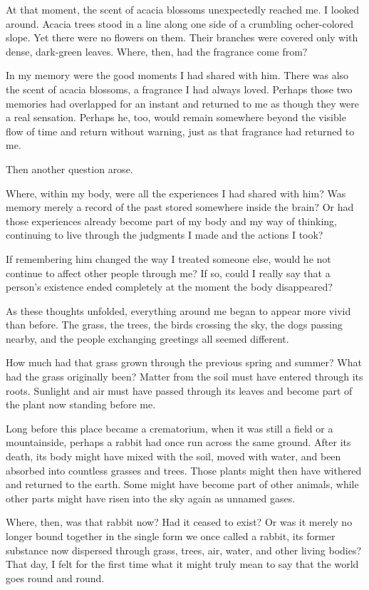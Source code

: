 At that moment, the scent of acacia blossoms unexpectedly reached me. I looked around. Acacia trees stood in a line along one side of a crumbling ocher-colored slope. Yet there were no flowers on them. Their branches were covered only with dense, dark-green leaves. Where, then, had the fragrance come from?

In my memory were the good moments I had shared with him. There was also the scent of acacia blossoms, a fragrance I had always loved. Perhaps those two memories had overlapped for an instant and returned to me as though they were a real sensation. Perhaps he, too, would remain somewhere beyond the visible flow of time and return without warning, just as that fragrance had returned to me.

Then another question arose.

Where, within my body, were all the experiences I had shared with him? Was memory merely a record of the past stored somewhere inside the brain? Or had those experiences already become part of my body and my way of thinking, continuing to live through the judgments I made and the actions I took?

If remembering him changed the way I treated someone else, would he not continue to affect other people through me? If so, could I really say that a person’s existence ended completely at the moment the body disappeared?

As these thoughts unfolded, everything around me began to appear more vivid than before. The grass, the trees, the birds crossing the sky, the dogs passing nearby, and the people exchanging greetings all seemed different.

How much had that grass grown through the previous spring and summer? What had the grass originally been? Matter from the soil must have entered through its roots. Sunlight and air must have passed through its leaves and become part of the plant now standing before me.

Long before this place became a crematorium, when it was still a field or a mountainside, perhaps a rabbit had once run across the same ground. After its death, its body might have mixed with the soil, moved with water, and been absorbed into countless grasses and trees. Those plants might then have withered and returned to the earth. Some might have become part of other animals, while other parts might have risen into the sky again as unnamed gases. 

Where, then, was that rabbit now? Had it ceased to exist? Or was it merely no longer bound together in the single form we once called a rabbit, its former substance now dispersed through grass, trees, air, water, and other living bodies? That day, I felt for the first time what it might truly mean to say that the world goes round and round.

